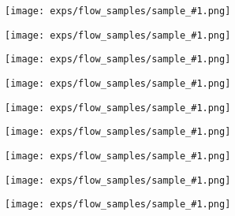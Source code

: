 \newcommand{\flowfig}[1]{
\texttt{[image: exps/flow\_samples/sample\_\#1.png]}}
\begin{figure*}
    \centering
    \flowfig{00004}%
    \flowfig{00016}%
    \flowfig{00031}%
    \flowfig{00038}%
    \flowfig{00041}%
    \flowfig{00050}%
    \flowfig{00054}%
    \flowfig{00061}%
    \flowfig{00078}%
    \caption{%
    \textbf{Example samples from the normalizing flow} 
    $f: X \mapsto z;~ p(z) \sim \mathcal{N}(0,1)$,
    trained on a dataset of ground truth 3D SMPL control skeletons $\{X_1, ..., X_N\}$.
    }\label{fig:nf_samples}
\end{figure*}